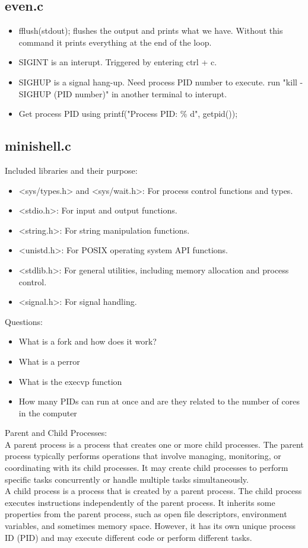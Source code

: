 \documentclass[12pt, letterpaper]{article}
\begin{document}
\subsection*{even.c}
\begin{itemize}
    \item fflush(stdout); flushes the output and prints what we have. Without this command it prints everything at the end of the loop. 
    \item SIGINT is an interupt. Triggered by entering ctrl + c. 
    \item SIGHUP is a signal hang-up. Need process PID number to execute. run "kill -SIGHUP (PID number)" in another terminal to interupt.
    \item Get process PID using printf("Process PID: \% d", getpid());
\end{itemize}

\subsection*{minishell.c}
Included libraries and their purpose: 
\begin{itemize}
    \item <sys/types.h> and <sys/wait.h>: For process control functions and types.
    \item <stdio.h>: For input and output functions.
    \item <string.h>: For string manipulation functions.
    \item <unistd.h>: For POSIX operating system API functions.
    \item <stdlib.h>: For general utilities, including memory allocation and process control.
    \item <signal.h>: For signal handling.
\end{itemize}

Questions: 
\begin{itemize}
    \item What is a fork and how does it work?
    \item What is a perror 
    \item What is the execvp function 
    \item How many PIDs can run at once and are they related to the number of cores in the computer 
\end{itemize}


Parent and Child Processes:\\ 
A parent process is a process that creates one or more child processes.
The parent process typically performs operations that involve managing, monitoring, or 
coordinating with its child processes. It may create child processes to perform specific 
tasks concurrently or handle multiple tasks simultaneously.\\ 
A child process is a process that is created by a parent process.
The child process executes instructions independently of the parent process. 
It inherits some properties from the parent process, such as open file descriptors, 
environment variables, and sometimes memory space. However, it has its own unique 
process ID (PID) and may execute different code or perform different tasks.
\end{document}
